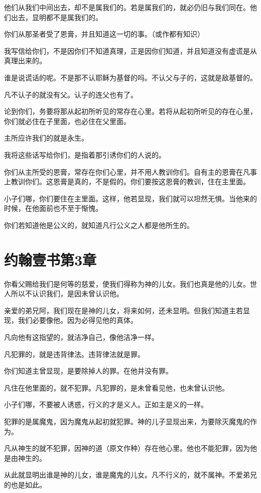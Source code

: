 \documentclass[12pt,oneside]{book}
\begin{document}
他们从我们中间出去，却不是属我们的。若是属我们的，就必仍旧与我们同在。他们出去，显明都不是属我们的。

你们从那圣者受了恩膏，并且知道这一切的事。（或作都有知识）

我写信给你们，不是因你们不知道真理，正是因你们知道，并且知道没有虚谎是从真理出来的。

谁是说谎话的呢。不是那不认耶稣为基督的吗。不认父与子的，这就是敌基督的。

凡不认子的就没有父。认子的连父也有了。

论到你们，务要将那从起初所听见的常存在心里。若将从起初所听见的存在心里，你们就必住在子里面，也必住在父里面。

主所应许我们的就是永生。

我将这些话写给你们，是指着那引诱你们的人说的。

你们从主所受的恩膏，常存在你们心里，并不用人教训你们。自有主的恩膏在凡事上教训你们。这恩膏是真的，不是假的。你们要按这恩膏的教训，住在主里面。

小子们哪，你们要住在主里面。这样，他若显现，我们就可以坦然无惧。当他来的时候，在他面前也不至于惭愧。

你们若知道他是公义的，就知道凡行公义之人都是他所生的。

\chapter{约翰壹书第3章}
你看父赐给我们是何等的慈爱，使我们得称为神的儿女。我们也真是他的儿女。世人所以不认识我们，是因未曾认识他。

亲爱的弟兄阿，我们现在是神的儿女，将来如何，还未显明。但我们知道主若显现，我们必要像他。因为必得见他的真体。

凡向他有这指望的，就洁净自己，像他洁净一样。

凡犯罪的，就是违背律法。违背律法就是罪。

你们知道主曾显现，是要除掉人的罪。在他并没有罪。

凡住在他里面的，就不犯罪。凡犯罪的，是未曾看见他，也未曾认识他。

小子们哪，不要被人诱惑，行义的才是义人。正如主是义的一样。

犯罪的是属魔鬼，因为魔鬼从起初就犯罪。神的儿子显现出来，为要除灭魔鬼的作为。

凡从神生的就不犯罪，因神的道（原文作种）存在他心里。他也不能犯罪，因为他是由神生的。

从此就显明出谁是神的儿女，谁是魔鬼的儿女。凡不行义的，就不属神。不爱弟兄的也是如此。
\end{document}
